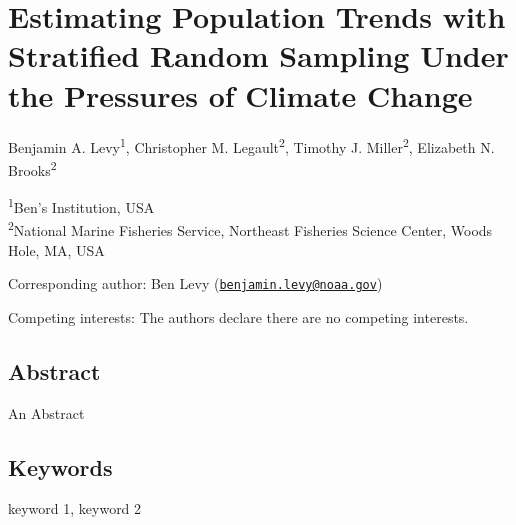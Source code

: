 \documentclass[
  12pt,
]{article}
\author{}
\date{\vspace{-2.5em}}
\begin{document}
\newpage

\hypertarget{estimating-population-trends-with-stratified-random-sampling-under-the-pressures-of-climate-change}{%
\section{Estimating Population Trends with Stratified Random Sampling Under the Pressures of Climate Change}\label{estimating-population-trends-with-stratified-random-sampling-under-the-pressures-of-climate-change}}

Benjamin A. Levy\textsuperscript{1}, Christopher M. Legault\textsuperscript{2}, Timothy J. Miller\textsuperscript{2}, Elizabeth N. Brooks\textsuperscript{2}

\textsuperscript{1}Ben's Institution, USA\\
\textsuperscript{2}National Marine Fisheries Service, Northeast Fisheries Science Center, Woods Hole, MA, USA

Corresponding author: Ben Levy (\href{mailto:benjamin.levy@noaa.gov}{\nolinkurl{benjamin.levy@noaa.gov}})

Competing interests: The authors declare there are no competing interests.

\newpage

\hypertarget{abstract}{%
\subsection{Abstract}\label{abstract}}

An Abstract

\hypertarget{keywords}{%
\subsection{Keywords}\label{keywords}}

keyword 1, keyword 2

\newpage
\end{document}

